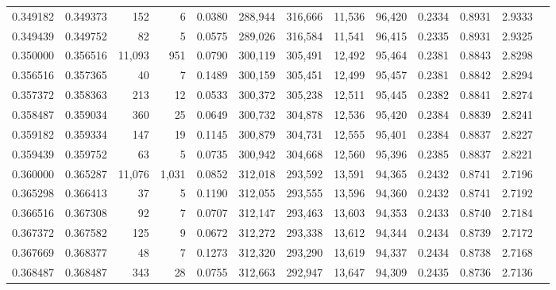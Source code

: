 \begin{tabular}{rrrrrrrrrrrrr}
0.349182 & 0.349373 &    152 &     6 &                                     0.0380 & 288,944 & 316,666 &  11,536 &  96,420 & 0.2334 & 0.8931 & 2.9333 \\
0.349439 & 0.349752 &     82 &     5 &                                     0.0575 & 289,026 & 316,584 &  11,541 &  96,415 & 0.2335 & 0.8931 & 2.9325 \\
0.350000 & 0.356516 & 11,093 &   951 &                                     0.0790 & 300,119 & 305,491 &  12,492 &  95,464 & 0.2381 & 0.8843 & 2.8298 \\
0.356516 & 0.357365 &     40 &     7 &                                     0.1489 & 300,159 & 305,451 &  12,499 &  95,457 & 0.2381 & 0.8842 & 2.8294 \\
0.357372 & 0.358363 &    213 &    12 &                                     0.0533 & 300,372 & 305,238 &  12,511 &  95,445 & 0.2382 & 0.8841 & 2.8274 \\
0.358487 & 0.359034 &    360 &    25 &                                     0.0649 & 300,732 & 304,878 &  12,536 &  95,420 & 0.2384 & 0.8839 & 2.8241 \\
0.359182 & 0.359334 &    147 &    19 &                                     0.1145 & 300,879 & 304,731 &  12,555 &  95,401 & 0.2384 & 0.8837 & 2.8227 \\
0.359439 & 0.359752 &     63 &     5 &                                     0.0735 & 300,942 & 304,668 &  12,560 &  95,396 & 0.2385 & 0.8837 & 2.8221 \\
0.360000 & 0.365287 & 11,076 & 1,031 &                                     0.0852 & 312,018 & 293,592 &  13,591 &  94,365 & 0.2432 & 0.8741 & 2.7196 \\
0.365298 & 0.366413 &     37 &     5 &                                     0.1190 & 312,055 & 293,555 &  13,596 &  94,360 & 0.2432 & 0.8741 & 2.7192 \\
0.366516 & 0.367308 &     92 &     7 &                                     0.0707 & 312,147 & 293,463 &  13,603 &  94,353 & 0.2433 & 0.8740 & 2.7184 \\
0.367372 & 0.367582 &    125 &     9 &                                     0.0672 & 312,272 & 293,338 &  13,612 &  94,344 & 0.2434 & 0.8739 & 2.7172 \\
0.367669 & 0.368377 &     48 &     7 &                                     0.1273 & 312,320 & 293,290 &  13,619 &  94,337 & 0.2434 & 0.8738 & 2.7168 \\
0.368487 & 0.368487 &    343 &    28 &                                     0.0755 & 312,663 & 292,947 &  13,647 &  94,309 & 0.2435 & 0.8736 & 2.7136 \\

\end{tabular}
